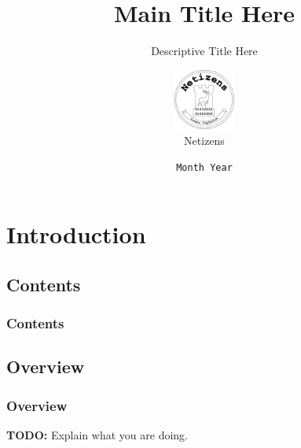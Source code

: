 \documentclass{beamer}
\title[Crisis]{Main Title Here}
\subtitle{Descriptive Title Here}
\author{
  \includegraphics[height=2cm,width=2cm]{logo-black}
  \\
  Netizens
}
\institute{
  \inst{1}
  Cyber Security
  \\
  Computer Science
  \\
  University of Hertfordshire
}
\date{\texttt{\footnotesize Month Year}}
\begin{document}
  \section*{}
    \frame{\titlepage}
  \section{Introduction}
    \subsection{Contents}
      \begin{frame}
        \frametitle{Contents}
        \tableofcontents[hideallsubsections]
      \end{frame}
    \subsection{Overview}
      \begin{frame}
        \frametitle{Overview}
        \textbf{TODO:} Explain what you are doing.
      \end{frame}
\end{document}
